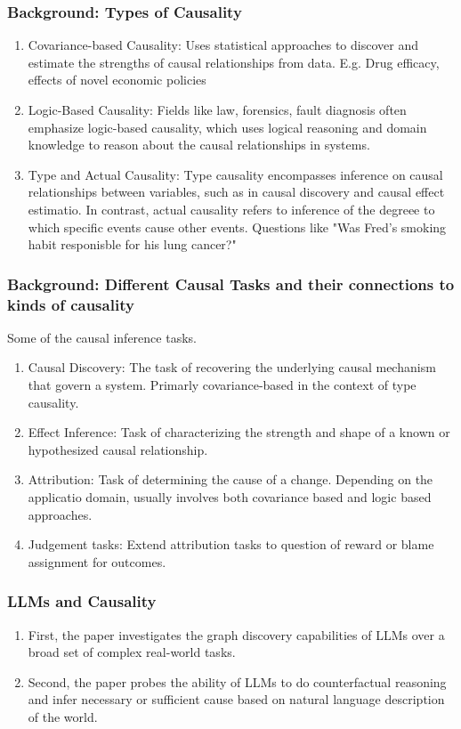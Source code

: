 \documentclass{beamer}
\begin{document}
\begin{frame}
	\frametitle{Background: Types of Causality}
	\begin{enumerate}
		\item Covariance-based Causality: Uses statistical
			approaches to discover and estimate the strengths of
			causal relationships from data. E.g. Drug efficacy, effects 
			of novel economic policies
		\item Logic-Based Causality: Fields like law, forensics, fault diagnosis
			often emphasize logic-based causality, which uses logical
			reasoning and domain knowledge to reason about the causal 
			relationships in systems.
		\item Type and Actual Causality: Type causality encompasses inference
			on causal relationships between variables, such as in causal 
			discovery and causal effect estimatio. In contrast, actual 
			causality refers to inference of the degreee to which specific
			events cause other events. Questions like "Was Fred's smoking 
			habit responisble for his lung cancer?"
	\end{enumerate}
\end{frame}

\begin{frame}
	\frametitle{Background: Different Causal Tasks and their connections to kinds of causality}
	Some of the causal inference tasks.
	\begin{enumerate}
		\item Causal Discovery: The task of recovering the underlying causal
			mechanism that govern a system. Primarly covariance-based in the
			context of type causality.
		\item Effect Inference: Task of characterizing the strength and shape of 
			a known or hypothesized causal relationship. 
		\item Attribution: Task of determining the cause of a change. Depending on the applicatio domain, usually involves both covariance based and logic based approaches.
		\item Judgement tasks: Extend attribution tasks to question of reward or
			blame assignment for outcomes.
	\end{enumerate}
\end{frame}

\begin{frame}
	\frametitle{LLMs and Causality}
	\begin{enumerate}
		\item First, the paper investigates the graph discovery capabilities of
			LLMs over a broad set of complex real-world tasks.
		\item Second, the paper probes the ability of LLMs to do counterfactual
			reasoning and infer necessary or sufficient cause based on
			natural language description of the world.
	\end{enumerate}
\end{frame}
\end{document}
